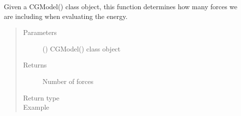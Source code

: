 \documentclass[letterpaper,12pt,english,openany,oneside]{sphinxmanual}
\begin{document}
\begin{fulllineitems}
\label{\detokenize{build:build.cg_build.get_num_forces}}
Given a CGModel() class object, this function determines how many forces we are including when evaluating the energy.
\begin{quote}\begin{description}
\item[{Parameters}] \leavevmode
{} () \textendash{} CGModel() class object

\item[{Returns}] \leavevmode
Number of forces

\item[{Return type}] \leavevmode
{}

\item[{Example}] \leavevmode
\end{description}\end{quote}

\begin{sphinxVerbatim}[commandchars=\\\{\}]
   
  
  
\end{sphinxVerbatim}

\end{fulllineitems}

\end{document}
